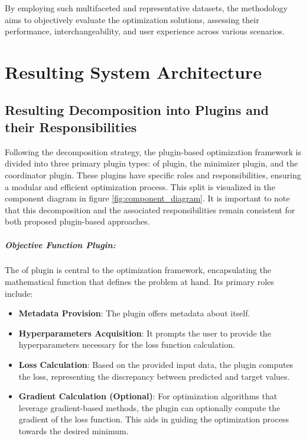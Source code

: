 \documentclass[
  a4paper,  %
  twoside,  %
  bibliography=totoc,
  headsepline,
  cleardoublepage=empty,
  parskip=half,
  draft=false
]{scrbook}
\begin{document}
By employing such multifaceted and representative datasets, the methodology aims to objectively evaluate the optimization solutions, assessing their performance, interchangeability, and user experience across various scenarios.

\chapter{Resulting System Architecture}
\label{chap:architecture}


\section{Resulting Decomposition into Plugins and their Responsibilities}
\label{sec:resdecomposition}

Following the decomposition strategy, the plugin-based optimization framework is divided into three primary plugin types:
\gls{of} plugin, the minimizer plugin, and the coordinator plugin.
These plugins have specific roles and responsibilities, ensuring a modular and efficient optimization process.
This split is visualized in the component diagram in figure \ref{fig:component_diagram}.
It is important to note that this decomposition and the associated responsibilities remain consistent for both proposed plugin-based approaches.

\paragraph{Objective Function Plugin:}

The \gls{of} plugin is central to the optimization framework, encapsulating the mathematical function that defines the problem at hand.
Its primary roles include:

\begin{itemize}
\item \textbf{Metadata Provision}: The plugin offers metadata about itself.
\item \textbf{Hyperparameters Acquisition}: It prompts the user to provide the hyperparameters necessary for the loss function calculation.
\item \textbf{Loss Calculation}: Based on the provided input data, the plugin computes the loss, representing the discrepancy between predicted and target values.
\item \textbf{Gradient Calculation (Optional)}: For optimization algorithms that leverage gradient-based methods, the plugin can optionally compute the gradient of the loss function.
This aids in guiding the optimization process towards the desired minimum.
\end{itemize}
\end{document}
